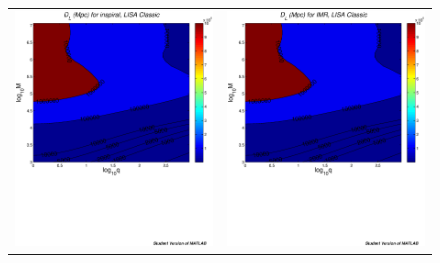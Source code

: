 \documentclass{iopart}
\begin{document}
%
\begin{figure}[H]
\begin{center}
\begin{tabular}{cc}
\includegraphics[scale=0.41,clip=true]{FigEmanuele/InspDLContour.ps}
&\includegraphics[scale=0.41,clip=true]{FigEmanuele/IMRDLContour.ps}\\

\end{tabular}
\end{center}
\end{figure}
\end{document}
